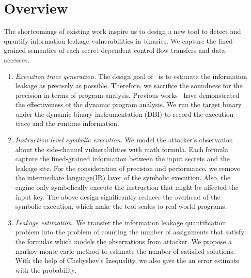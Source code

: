 \section{Overview}
The shortcomings of existing work inspire us to design a new tool to detect
and quantify information leakage vulnerabilities in binaries. We capture the 
fined-grained semantics of each secret-dependent control-flow transfers 
and data-accesses. 

\begin{enumerate}
    \item \textit{Execution trace generation.} The design goal of \tool\ is to
    estimate the information leakage as precisely as possible. Therefore,
    we sacrifice the soundness for the precision in terms of program analysis.
    Previous works~\cite{203878,217537} have demonstrated the effectiveness of the
    dynamic program analysis. We run the target binary under the dynamic binary
    instrumentation (DBI) to record the execution trace and the runtime information.
    \item \textit{Instruction level symbolic execution.} We model the 
    attacker's observation about the side-channel vulnerabilities with math
    formula. Each formula capture the fined-grained information between the input secrets
    and the leakage site. For the consideration of precision and performance, 
    we remove the intermediate language(IR) layer of the symbolic execution. 
    Also, the engine only symbolically execute the instruction that might be affected the
    input key. The above design significantly reduces the overhead of the symbolic
    execution, which make the tool scales to real-world programs.
    \item \textit{Leakage estimation.} We transfer the information leakage quantification
    problem into the problem of counting the number of assignments that satisfy the formulas
    which models the observations from attacker. We propose a markov monte carlo method to 
    estimate the number of satisfied solutions. With the help of Chebyshev's Inequality,
    we also give the an error estimate with the probability.
\end{enumerate}
